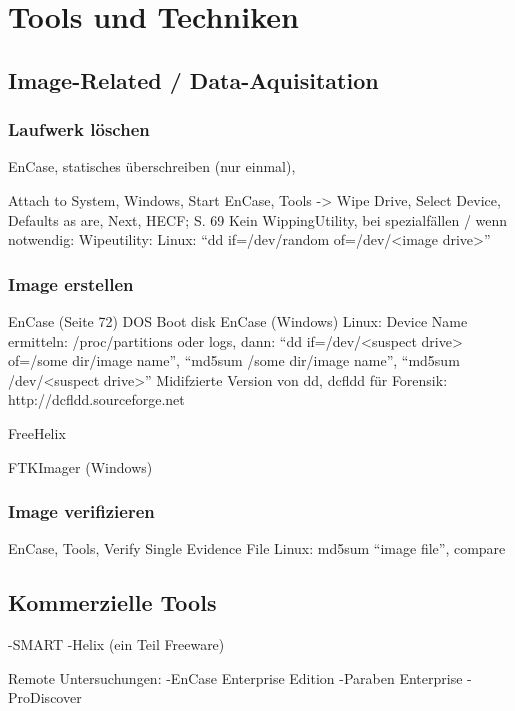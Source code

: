 \chapter{Tools und Techniken}

\section{Image-Related / Data-Aquisitation}
\subsection{Laufwerk löschen}
EnCase, statisches überschreiben (nur einmal), 

Attach to System, Windows, Start EnCase, Tools -> Wipe Drive, Select Device, Defaults as are, Next, HECF; S. 69
Kein WippingUtility, bei spezialfällen / wenn notwendig: Wipeutility: Linux: "`dd if=/dev/random of=/dev/<image drive>"'


\subsection{Image erstellen}
EnCase (Seite 72) DOS Boot disk
EnCase (Windows)
Linux: Device Name ermitteln: /proc/partitions oder logs, dann: "`dd if=/dev/<suspect drive> of=/some dir/image name"', "`md5sum /some dir/image name"', "`md5sum /dev/<suspect drive>"'
Midifzierte Version von dd, dcfldd für Forensik: http://dcfldd.sourceforge.net

FreeHelix

FTKImager (Windows)

\subsection{Image verifizieren}
EnCase, Tools, Verify Single Evidence File
Linux: md5sum "`image file"', compare




\section{Kommerzielle Tools}
-SMART
-Helix (ein Teil Freeware)

Remote Untersuchungen:
-EnCase Enterprise Edition
-Paraben Enterprise
-ProDiscover